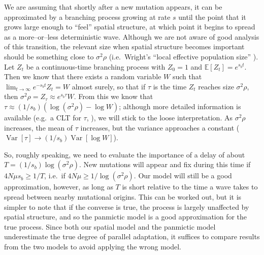 \documentclass{article}
\newcommand{\var}{\mathop{\mbox{Var}}}
\newcommand{\E}{\mathbb{E}}
\begin{document}
We are assuming that shortly after a new mutation appears, 
it can be approximated by a branching process growing at rate $s$
until the point that it grows large enough to ``feel'' spatial structure,
at which point it begins to spread as a more--or--less deterministic wave.
Although we are not aware of good analysis of this transition, 
the relevant size when spatial structure becomes important
should be something close to $\sigma^2 \rho$ 
(i.e.\ Wright's ``local effective population size'' \citep{XXX}).
Let $Z_t$ be a continuous-time branching process with $Z_0=1$ and $\E[Z_t] = e^{s_b t}$.
Then we know that there exists a random variable $W$ such that $\lim_{t\to\infty} e^{-s_b t} Z_t = W$ almost surely,
so that if $\tau$ is the time $Z_t$ reaches size $\sigma^2 \rho$, %
then $\sigma^2 \rho = Z_\tau \approx e^{s_b \tau} W$.
From this we know that $\tau \approx (1/s_b) (\log (\sigma^2 \rho) - \log W)$;
although more detailed information is available (e.g.\ a CLT for $\tau$, \citet{XXX}),
we will stick to the loose interpretation.
As $\sigma^2 \rho$ increases, the mean of $\tau$ increases, but the variance approaches a constant
($\var[\tau] \to (1/s_b) \var[\log W]$).

So, roughly speaking, we need to evaluate the importance of a delay of about $T = (1/s_b) \log (\sigma^2 \rho)$.
New mutations will appear and fix during this time if $4N\mu s_b \ge 1/T$,
i.e.\ if $4 N \mu \ge 1/\log (\sigma^2 \rho)$.
Our model will still be a good approximation, however, 
as long as $T$ is short relative to the time a wave takes to spread between nearby mutational origins.
This can be worked out,
but it is simpler to note that if the converse is true, 
the process is largely unaffected by spatial structure,
and so the panmictic model is a good approximation for the true process.
Since both our spatial model and the panmictic model underestimate the true degree of parallel adaptation,
it suffices to compare results from the two models to avoid applying the wrong model.

\end{document}
